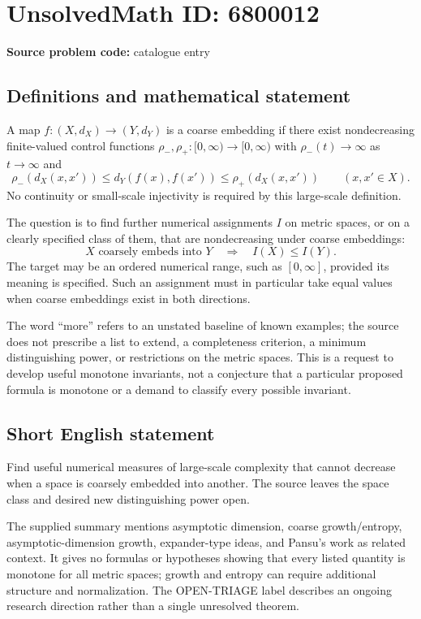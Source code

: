 \documentclass[11pt]{article}
\begin{document}
\section*{UnsolvedMath ID: 6800012}
\textbf{Source problem code:} catalogue entry
\subsection{Definitions and mathematical statement}
A map $f:(X,d_X)\to(Y,d_Y)$ is a coarse embedding if there exist nondecreasing finite-valued control functions $\rho_-,\rho_+:[0,\infty)\to[0,\infty)$ with $\rho_-(t)\to\infty$ as $t\to\infty$ and
\[
 \rho_-(d_X(x,x'))\le d_Y(f(x),f(x'))
           \le\rho_+(d_X(x,x'))\qquad(x,x'\in X).
\]
No continuity or small-scale injectivity is required by this large-scale definition.

The question is to find further numerical assignments $I$ on metric spaces, or on a clearly specified class of them, that are nondecreasing under coarse embeddings:
\[
 X\text{ coarsely embeds into }Y\quad\Longrightarrow\quad I(X)\le I(Y).
\]
The target may be an ordered numerical range, such as $[0,\infty]$, provided its meaning is specified. Such an assignment must in particular take equal values when coarse embeddings exist in both directions.

The word ``more'' refers to an unstated baseline of known examples; the source does not prescribe a list to extend, a completeness criterion, a minimum distinguishing power, or restrictions on the metric spaces. This is a request to develop useful monotone invariants, not a conjecture that a particular proposed formula is monotone or a demand to classify every possible invariant.
\subsection{Short English statement}
Find useful numerical measures of large-scale complexity that cannot decrease when a space is coarsely embedded into another. The source leaves the space class and desired new distinguishing power open.

The supplied summary mentions asymptotic dimension, coarse growth/entropy, asymptotic-dimension growth, expander-type ideas, and Pansu's work as related context. It gives no formulas or hypotheses showing that every listed quantity is monotone for all metric spaces; growth and entropy can require additional structure and normalization. The OPEN-TRIAGE label describes an ongoing research direction rather than a single unresolved theorem.
\end{document}
